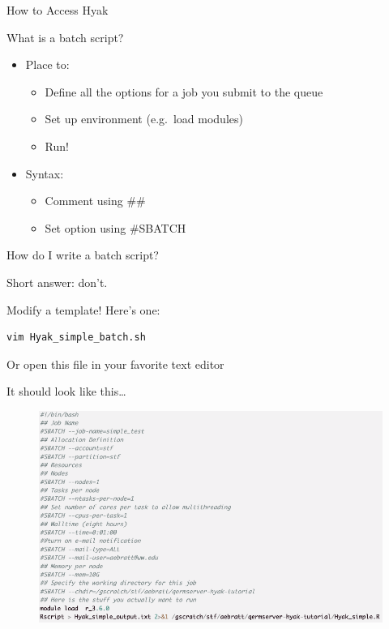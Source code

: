 \documentclass[ignorenonframetext,]{beamer}
\begin{document}
\begin{frame}[fragile]{How to Access Hyak}
\begin{block}{What is a batch script?}

\begin{itemize}[<+->]
\item
  Place to:

  \begin{itemize}[<+->]
  \item
    Define all the options for a job you submit to the queue
  \item
    Set up environment (e.g.~load modules)
  \item
    Run!
  \end{itemize}
\item
  Syntax:

  \begin{itemize}[<+->]
  \item
    Comment using \#\#
  \item
    Set option using \#SBATCH
  \end{itemize}
\end{itemize}

\end{block}

\begin{block}{How do I write a batch script?}

Short answer: don't.

Modify a template! Here's one:

\begin{verbatim}
vim Hyak_simple_batch.sh
\end{verbatim}

Or open this file in your favorite text editor

\end{block}

\begin{block}{It should look like this\ldots{}}

\begin{figure}
\centering
\includegraphics[width=6.25000in]{images/Hyak_simple_batch.png}
\caption{}
\end{figure}


\end{block}
\end{frame}
\end{document}
